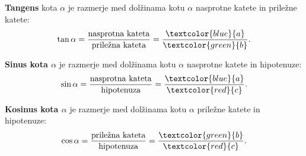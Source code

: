 \begin{figure}[H]
                        \end{figure}
                    

                    
                        \textbf{Tangens} kota $\alpha$ je razmerje med dolžinama kotu $\alpha$ nasprotne katete in priležne katete: 
                        $$\tan\alpha = \frac{\textrm{nasprotna kateta}}{\textrm{priležna kateta}}=\dfrac{\textcolor{blue}{a}}{\textcolor{green}{b}}.$$
                    


                    
                        \textbf{Sinus kota $\alpha$} je razmerje med dolžinama kotu $\alpha$ nasprotne katete in hipotenuze: 
                        $$\sin\alpha = \dfrac{\textrm{nasprotna kateta}}{\textrm{hipotenuza}}=\dfrac{\textcolor{blue}{a}}{\textcolor{red}{c}}.$$
                    

                    
                        \textbf{Kosinus kota $\alpha$} je razmerje med dolžinama kotu $\alpha$ priležne katete in hipotenuze: 
                        $$\cos\alpha = \frac{\textrm{priležna kateta}}{\textrm{hipotenuza}}=\dfrac{\textcolor{green}{b}}{\textcolor{red}{c}}.$$
                    
            
            


